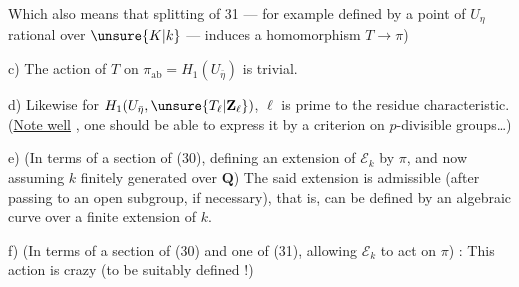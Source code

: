 Which also means that   splitting of 31 --- for example defined by a point of $U_\eta$ rational over $\unsure{K|k}$ --- induces a homomorphism $T\longrightarrow\pi$)

\noindent c) The action of $T$ on $\pi_{\mathrm{ab}}=H_1(U_{\bar\eta})$ is trivial.

\noindent d) Likewise for $H_1(U_{\bar\eta},\unsure{T_\ell|\mathbf Z_\ell})$,  $\ell$ is prime to the residue characteristic. (\uline{Note well}  , one should be able to express it by a criterion on $p$-divisible groups\ldots)

\noindent e) (In terms of a section of (30), defining an extension of $\mathcal E_k$ by $\pi$, and now assuming $k$ finitely generated over $\mathbf Q$) The said extension is admissible (after passing to an open subgroup,  if necessary), that is, can be defined by an algebraic curve over  a finite extension of $k$.

\noindent f) (In terms of a section of (30) and one of (31), allowing $\mathcal E_k$ to act on $\pi$) : This action is   crazy (to be suitably defined !)
